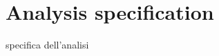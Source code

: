 \section{Analysis specification}
\label{sec:AnalysisSpec}
specifica dell'analisi

\begin{comment}
\subsection{Abstract succinct}
\[
\begin{array}{llcl}
\mathit{Abstract\ cache} & \Cat & : & \labs \rightarrow \absvalues \\
\mathit{Abstract\ variable\ environment} & \Env & : & \vars \rightarrow \absvalues \\
\mathit{Abstract\ memory} & \absmem & : & \labs \times \perms \rightarrow \absvalues \\
\mathit{Abstract\ permission\ cache} & \Pat & : & \labs \rightarrow \perms \\
\end{array}
\]

\begin{tabular}{l l l l}
{[\textit{PV-Name}]}&\multicolumn{3}{l}{$\aenvs \modelrho n : \vat$ iff $n \in \vat$} \\
{[\textit{PV-Var}]}&\multicolumn{3}{l}{$\aenvs \modelrho x : \vat$ iff $\Env(x) \subseteq \vat$} \\ 
{[\textit{PV-Cons}]}&\multicolumn{3}{l}{$\aenvs \modelrho c : \vat$ iff $\{\hat{c}\} \subseteq \vat$} \\
{[\textit{PV-Ref}]}&\multicolumn{3}{l}{$\aenvs \modelrho \ell : \vat$ iff $\ell \in \vat$} \\
{[\textit{PV-Lambda}]}&\multicolumn{3}{l}{$\aenvs \modelrho \lam{x}{e} : \vat$ iff $\lambda_x^{\rho_e} \in \vat \wedge \aenvs \modelrho e : \vat'\gg \rho' $} \\
&&\multicolumn{2}{l}{$\vat' \sqsubseteq \Env(\lambda x) \wedge \rho' \sqsubseteq \rho_e $}\\
{[\textit{PV-Ref}]}&\multicolumn{3}{l}{$\aenvs \modelrho \rec{\vec{str_i : v_i}} : \vat$ iff $\{\absrec{\vec{str_i: v_i}}_{\absC,\rho}\} \sqsubseteq \hat{v}$} \\
\end{tabular}


\end{comment}
